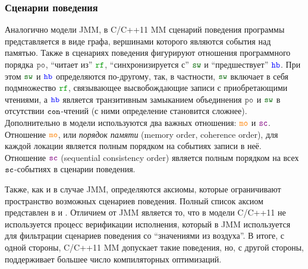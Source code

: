 \subsubsection{Сценарии поведения}
Аналогично модели JMM, в C/C++11 MM сценарий поведения программы представляется в виде графа,
вершинами которого являются события над памятью.
Также в сценариях поведения фигурируют
отношения программного порядка $\lPO$, ``читает из'' $\lRF$, ``синхронизируется с'' $\lSW$
и ``предшествует'' $\lHB$.
При этом $\lSW$ и $\lHB$ определяются по-другому, так, в частности, $\lSW$ включает в себя подмножество $\lRF$,
связывающее высвобождающие записи с приобретающими чтениями, а $\lHB$ является транзитивным замыканием объединения
$\lPO$ и $\lSW$ в отсутствии ${\mathtt{con}}$-чтений (с ними определение становится сложнее).
Дополнительно в модели используются два важных отношения: $\lMO$ и $\lSC$.
Отношение $\lMO$, или \emph{порядок памяти} (memory order, coherence order), для каждой локации является полным порядком
на событиях записи в неё. Отношение $\lSC$ (sequential consistency order) является полным порядком на всех ${\mathtt{sc}}$-событиях
в сценарии поведения.

Также, как и в случае JMM, определяются аксиомы, которые ограничивают пространство возможных сценариев поведения.
Полный список аксиом представлен в \cite{Batty-al:POPL11} и \cite{Vafeiadis-Narayan:OOPSLA13}.
Отличием от JMM является то, что в модели C/C++11 не используется процесс верификации исполнения, который в JMM
используется для фильтрации сценариев поведения со ``значениями из воздуха''.
В итоге, с одной стороны, C/C++11 MM допускает такие поведения, но, с другой стороны, поддерживает большее число
компиляторных оптимизаций.

